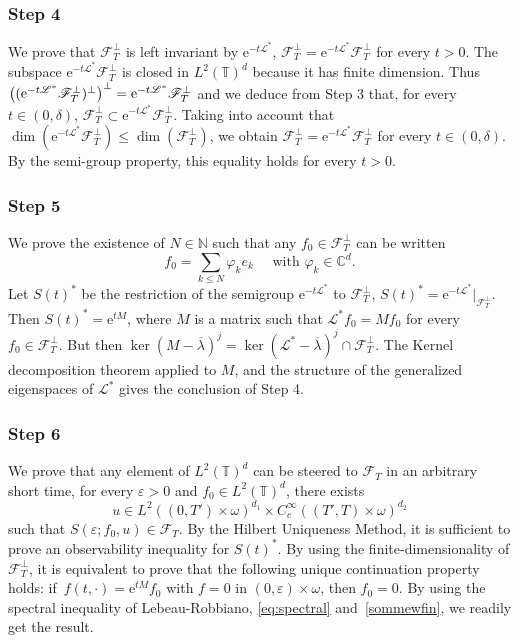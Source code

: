 \documentclass[JEP,XML,SOM,Unicode,NoEqCountersInSection]{cedram}
\let\mathcal\mathscr
\theoremstyle{plain}
\theoremstyle{definition}
\theoremstyle{remark}
\newcommand{\set}{\mathbb}
\newcommand{\N}{\set{N}}
\renewcommand{\C}{\set{C}}
\newcommand{\T}{\set{T}}
\newcommand{\eu}{\mathrm e}
\let\originalleft\left
\let\originalright\right
\renewcommand{\left}{\mathopen{}\mathclose\bgroup\originalleft}
\renewcommand{\right}{\aftergroup\egroup\originalright}
\begin{document}
\subsubsection*{Step 4}
We prove that $\mathcal{F}_{T}^{\perp}$ is left invariant by $\eu^{-t {\mathcal{L}^*}}$, \ie $\mathcal{F}_{T}^{\perp}=\eu^{-t {\mathcal{L}^*}} \mathcal{F}_{T}^{\perp}$ for every $t>0$.
The subspace $\eu^{-t {\mathcal{L}^*}} \mathcal{F}_{T}^{\perp}$ is closed in $L^2(\T)^d$ because it has finite dimension. Thus
$\left((\eu^{-t {\mathcal{L}^*}} \mathcal{F}_{T}^{\perp})^\perp \right)^\perp=\eu^{-t {\mathcal{L}^*}} \mathcal{F}_{T}^{\perp}$
and we deduce from Step 3 that, for every $t\in(0,\delta)$, $\mathcal{F}_{T}^\perp \subset \eu^{-t {\mathcal{L}^*}} \mathcal{F}_{T}^{\perp}$.
Taking into account that $\dim(\eu^{-t {\mathcal{L}^*}} \mathcal{F}_{T}^{\perp}) \leq \dim(\mathcal{F}_{T}^{\perp})$, we obtain $\mathcal{F}_{T}^\perp = \eu^{-t {\mathcal{L}^*}} \mathcal{F}_{T}^{\perp}$ for every $t\in(0,\delta)$. By the semi-group property, this equality holds for every $t >0$.

\subsubsection*{Step 5}
We prove the existence of $N\in\N$ such that any
$f_0 \in \mathcal{F}_{T}^{\perp}$ can be written\vspace*{-3pt}
\begin{equation}
f_0 = \sum_{k \leq N} \varphi_k e_k \quad \text{ with } \varphi_k \in \C^d.
\label{sommewfin}
\end{equation}
Let ${S}(t)^*$ be the restriction of the semigroup $\eu^{-t {\mathcal{L}^*}}$ to
$\mathcal{F}_{T}^{\perp}$, \ie ${S}(t)^* = \eu^{-t
{\mathcal{L}^*}}|_{\mathcal{F}_{T}^{\perp}}$. Then ${S}(t)^*=\eu^{tM}$, where $M$ is a matrix
such that ${\mathcal{L}^*} f_0 = M f_0$ for every $f_0 \in \mathcal{F}_{T}^{\perp}$. But then
$\ker(M-\overline{\lambda})^{j} = \ker({\mathcal{L}^*}-\overline{\lambda})^{j} \cap
\mathcal{F}_{T}^\perp$. The Kernel decomposition theorem applied to $M$, and the structure of
the generalized eigenspaces of $\mathcal{L}^*$ gives the conclusion of Step 4.

\subsubsection*{Step 6}
We prove that any element of $L^2(\T)^{d}$ can be steered to $\mathcal{F}_{T}$ in an arbitrary short time, \ie for every $\varepsilon >0$ and $f_0 \in L^2(\T)^{d}$, there exists
\[
u \in L^2((0,T')\times\omega)^{d_1} \times C^\infty_c ((T',T)\times\omega)^{d_2}
\]
such that $S(\varepsilon;f_0, u) \in \mathcal{F}_{T}$.
By the Hilbert Uniqueness Method, it is sufficient to prove an observability inequality for ${S}(t)^*$. By using the finite-dimensionality of $\mathcal{F}_{T}^{\perp}$, it is equivalent to prove that the following unique continuation property holds: if~$f(t,\cdot)=\eu^{tM} f_0$ with $f=0$ in $(0,\varepsilon)\times \omega$, then $f_0 = 0$. By using the spectral inequality of Lebeau-Robbiano, \ie \eqref{eq:spectral} and~\eqref{sommewfin}, we readily get the result.
\end{document}

